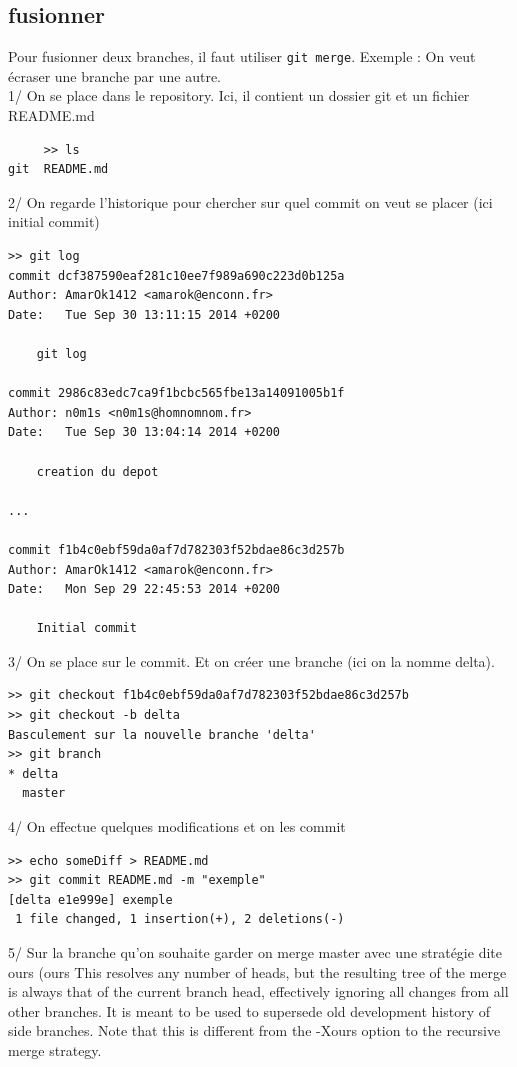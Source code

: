 \documentclass[a4paper,10pt]{report}
\begin{document}
     \subsection{fusionner}
     Pour fusionner deux branches, il faut utiliser \verb|git merge|.
     Exemple : On veut écraser une branche par une autre.\\
     1/ On se place dans le repository. Ici, il contient un dossier git et un fichier README.md
\begin{verbatim}
     >> ls
git  README.md
\end{verbatim}
     2/ On regarde l'historique pour chercher sur quel commit on veut se placer (ici initial commit)
\begin{verbatim}
>> git log
commit dcf387590eaf281c10ee7f989a690c223d0b125a
Author: AmarOk1412 <amarok@enconn.fr>
Date:   Tue Sep 30 13:11:15 2014 +0200

    git log

commit 2986c83edc7ca9f1bcbc565fbe13a14091005b1f
Author: n0m1s <n0m1s@homnomnom.fr>
Date:   Tue Sep 30 13:04:14 2014 +0200

    creation du depot

...

commit f1b4c0ebf59da0af7d782303f52bdae86c3d257b
Author: AmarOk1412 <amarok@enconn.fr>
Date:   Mon Sep 29 22:45:53 2014 +0200

    Initial commit
\end{verbatim}
    3/ On se place sur le commit. Et on créer une branche (ici on la nomme delta).
 \begin{verbatim}
>> git checkout f1b4c0ebf59da0af7d782303f52bdae86c3d257b
>> git checkout -b delta
Basculement sur la nouvelle branche 'delta'
>> git branch
* delta
  master
\end{verbatim}
    4/ On effectue quelques modifications et on les commit
\begin{verbatim}
>> echo someDiff > README.md 
>> git commit README.md -m "exemple"
[delta e1e999e] exemple
 1 file changed, 1 insertion(+), 2 deletions(-)
\end{verbatim}
    5/ Sur la branche qu'on souhaite garder on merge master avec une stratégie dite ours (ours
           This resolves any number of heads, but the resulting tree of the merge is always that of the current branch head, effectively ignoring
           all changes from all other branches. It is meant to be used to supersede old development history of side branches. Note that this is
           different from the -Xours option to the recursive merge strategy.
\end{document}
